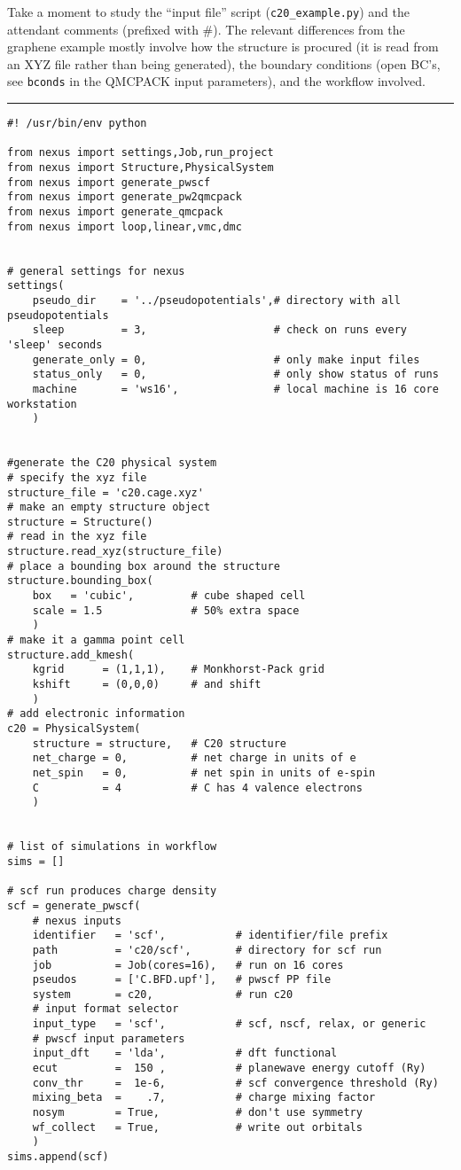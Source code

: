 \documentclass[oneside,11pt]{memoir}
\numberwithin{equation}{section}
\newcommand{\HRule}{\rule{\linewidth}{0.5mm}}
\begin{document}
Take a moment to study the ``input file'' script 
(\texttt{c20\_example.py}) and the attendant comments 
(prefixed with \#). The relevant differences from the graphene example
mostly involve how the structure is procured (it is read from an XYZ file
rather than being generated), the boundary conditions (open BC's, see 
\texttt{bconds} in the QMCPACK input parameters), and the workflow involved. 



\HRule
\begin{verbatim}
#! /usr/bin/env python

from nexus import settings,Job,run_project
from nexus import Structure,PhysicalSystem
from nexus import generate_pwscf
from nexus import generate_pw2qmcpack
from nexus import generate_qmcpack
from nexus import loop,linear,vmc,dmc


# general settings for nexus
settings(
    pseudo_dir    = '../pseudopotentials',# directory with all pseudopotentials
    sleep         = 3,                    # check on runs every 'sleep' seconds
    generate_only = 0,                    # only make input files
    status_only   = 0,                    # only show status of runs
    machine       = 'ws16',               # local machine is 16 core workstation
    )


#generate the C20 physical system
# specify the xyz file
structure_file = 'c20.cage.xyz'
# make an empty structure object
structure = Structure()
# read in the xyz file
structure.read_xyz(structure_file)
# place a bounding box around the structure
structure.bounding_box(
    box   = 'cubic',         # cube shaped cell
    scale = 1.5              # 50% extra space
    )
# make it a gamma point cell
structure.add_kmesh(
    kgrid      = (1,1,1),    # Monkhorst-Pack grid
    kshift     = (0,0,0)     # and shift
    )
# add electronic information
c20 = PhysicalSystem(
    structure = structure,   # C20 structure
    net_charge = 0,          # net charge in units of e
    net_spin   = 0,          # net spin in units of e-spin
    C          = 4           # C has 4 valence electrons
    ) 


# list of simulations in workflow
sims = []

# scf run produces charge density
scf = generate_pwscf(
    # nexus inputs
    identifier   = 'scf',           # identifier/file prefix
    path         = 'c20/scf',       # directory for scf run
    job          = Job(cores=16),   # run on 16 cores
    pseudos      = ['C.BFD.upf'],   # pwscf PP file
    system       = c20,             # run c20
    # input format selector
    input_type   = 'scf',           # scf, nscf, relax, or generic
    # pwscf input parameters
    input_dft    = 'lda',           # dft functional
    ecut         =  150 ,           # planewave energy cutoff (Ry)
    conv_thr     =  1e-6,           # scf convergence threshold (Ry)
    mixing_beta  =    .7,           # charge mixing factor
    nosym        = True,            # don't use symmetry
    wf_collect   = True,            # write out orbitals
    )
sims.append(scf)  


\end{verbatim}
\end{document}
